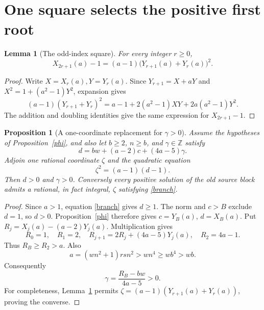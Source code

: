 \documentclass[11pt]{article}
\newtheorem{lemma}[theorem]{Lemma}
\newtheorem{proposition}[theorem]{Proposition}
\newcommand{\Z}{\mathbb Z}\newcommand{\N}{\mathbb Z_{\ge0}}
\begin{document}
\section{One square selects the positive first root}

\begin{lemma}[The odd-index square]\label{oddsquare}
For every integer \(r\ge0\),
\[
 X_{2r+1}(a)-1
       =(a-1)\bigl(Y_{r+1}(a)+Y_r(a)\bigr)^2.
\]
\end{lemma}
\begin{proof}
Write \(X=X_r(a),Y=Y_r(a)\).  Since
\(Y_{r+1}=X+aY\) and \(X^2=1+(a^2-1)Y^2\), expansion gives
\[
 (a-1)(Y_{r+1}+Y_r)^2
   =a-1+2(a^2-1)XY+2a(a^2-1)Y^2.
\]
The addition and doubling identities give the same expression for
\(X_{2r+1}-1\).
\end{proof}

\begin{proposition}[A one-coordinate replacement for \(\gamma>0\)]
\label{gamma}
Assume the hypotheses of Proposition~\ref{phi}, and also let
\(b\ge2\), \(n\ge b\), and \(\gamma\in\Z\) satisfy
\[
                 d=bw+(a-2)c+(4a-5)\gamma.
\]
Adjoin one rational coordinate \(\zeta\) and the quadratic equation
\begin{equation}\label{branch}
                         \zeta^2=(a-1)(d-1).
\end{equation}
Then \(d>0\) and \(\gamma>0\).
Conversely every positive solution of the old source block admits
a rational, in fact integral, \(\zeta\) satisfying \eqref{branch}.
\end{proposition}
\begin{proof}
Since \(a>1\), equation \eqref{branch} gives \(d\ge1\).
The norm and \(c>B\) exclude \(d=1\), so \(d>0\).
Proposition~\ref{phi} therefore gives
\(c=Y_B(a)\), \(d=X_B(a)\).
Put \(R_j=X_j(a)-(a-2)Y_j(a)\).  Multiplication gives
\[
 R_0=1,\quad R_1=2,\quad
 R_{j+1}=2R_j+(4a-5)Y_j(a),\quad R_2=4a-1.
\]
Thus \(R_B\ge R_2>a\).  Also
\[
                   a=(wn^2+1)rsn^2>wn^4\ge wb^4>wb.
\]
Consequently
\[
           \gamma=\frac{R_B-bw}{4a-5}>0.
\]
For completeness, Lemma~\ref{oddsquare} permits
\(\zeta=(a-1)(Y_{r+1}(a)+Y_r(a))\), proving the converse.
\end{proof}
\end{document}
